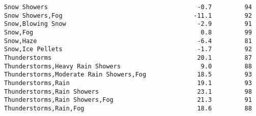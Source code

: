 \documentclass[11pt]{article}
\begin{document}
\begin{tcolorbox}[breakable, size=fbox, boxrule=.5pt, pad at break*=1mm, opacityfill=0]
\begin{Verbatim}[commandchars=\\\{\}]
Snow Showers                                         -0.7         94
Snow Showers,Fog                                    -11.1         92
Snow,Blowing Snow                                    -2.9         91
Snow,Fog                                              0.8         99
Snow,Haze                                            -6.4         81
Snow,Ice Pellets                                     -1.7         92
Thunderstorms                                        20.1         87
Thunderstorms,Heavy Rain Showers                      9.0         88
Thunderstorms,Moderate Rain Showers,Fog              18.5         93
Thunderstorms,Rain                                   19.1         93
Thunderstorms,Rain Showers                           23.1         98
Thunderstorms,Rain Showers,Fog                       21.3         91
Thunderstorms,Rain,Fog                               18.6         88


\end{Verbatim}
\end{tcolorbox}
\end{document}
